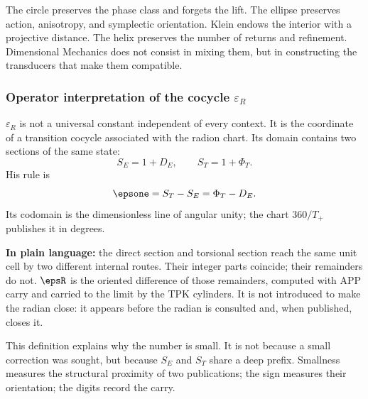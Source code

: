 The circle preserves the phase class and forgets the lift. The ellipse preserves
action, anisotropy, and symplectic orientation. Klein endows the interior with a
projective distance. The helix preserves the number of returns and refinement.
Dimensional Mechanics does not consist in mixing them, but in constructing the
transducers that make them compatible.

\subsubsection{Operator interpretation of the cocycle \(\varepsilon_R\)}

\(\varepsilon_R\) is not a universal constant independent of every context. It is the
coordinate of a transition cocycle associated with the radion chart. Its
domain contains two sections of the same state:
\[
S_E=1+D_E,
\qquad
S_T=1+\Phi_T.
\]
His rule is
\begin{equation}
\epsone=S_T-S_E=\Phi_T-D_E.
\label{eq:epsilon-final-meaning}
\end{equation}
Its codomain is the dimensionless line of angular unity; the chart
\(360/T_+\) publishes it in degrees.

\begin{exactbox}
\textbf{In plain language:} the direct section and torsional section reach
the same unit cell by two different internal routes. Their integer
parts coincide; their remainders do not. \(\epsR\) is the oriented difference of those
remainders, computed with APP carry and carried to the limit by the TPK
cylinders. It is not introduced to make the radian close: it appears before the
radian is consulted and, when published, closes it.
\end{exactbox}

This definition explains why the number is small. It is not because a
small correction was sought, but because \(S_E\) and \(S_T\) share a
deep prefix. Smallness measures the structural proximity of two
publications; the sign measures their orientation; the digits record the carry.

